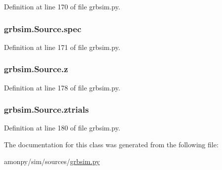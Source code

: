Definition at line 170 of file grbsim.\-py.

\hypertarget{classgrbsim_1_1_source_aa8feb6cf28391b9206c57f0b5ea1dd2a}{
\subsubsection[{spec}]{\setlength{\rightskip}{0pt plus 5cm}grbsim.\-Source.\-spec}}\label{classgrbsim_1_1_source_aa8feb6cf28391b9206c57f0b5ea1dd2a}


Definition at line 171 of file grbsim.\-py.

\hypertarget{classgrbsim_1_1_source_aa983a728c20508521a6e442d8692802a}{
\subsubsection[{z}]{\setlength{\rightskip}{0pt plus 5cm}grbsim.\-Source.\-z}}\label{classgrbsim_1_1_source_aa983a728c20508521a6e442d8692802a}


Definition at line 178 of file grbsim.\-py.

\hypertarget{classgrbsim_1_1_source_a49ad1adc6c791d565301090c86734bd3}{
\subsubsection[{ztrials}]{\setlength{\rightskip}{0pt plus 5cm}grbsim.\-Source.\-ztrials}}\label{classgrbsim_1_1_source_a49ad1adc6c791d565301090c86734bd3}


Definition at line 180 of file grbsim.\-py.



The documentation for this class was generated from the following file\-:\begin{DoxyCompactItemize}
\item 
amonpy/sim/sources/\hyperlink{grbsim_8py}{grbsim.\-py}\end{DoxyCompactItemize}

